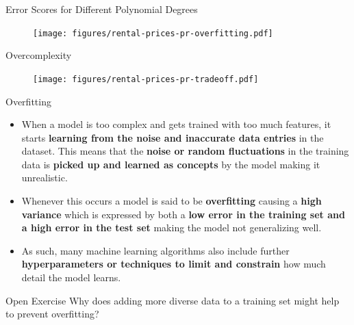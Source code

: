 \documentclass[main.tex]{subfiles}
\begin{document}
    \begin{frame}{Error Scores for Different Polynomial Degrees}
        \begin{figure}
            \label{fig:rental-prices-pr-overfitting}
            \texttt{[image: figures/rental-prices-pr-overfitting.pdf]}
        \end{figure}
    \end{frame}

    \begin{frame}{Overcomplexity}
        \begin{figure}
            \label{fig:rental-prices-pr-tradeoff}
            \texttt{[image: figures/rental-prices-pr-tradeoff.pdf]}
        \end{figure}
    \end{frame}

    \begin{frame}{Overfitting}
        \begin{itemize}
            \item When a model is too complex and gets trained with too much features, it starts \textbf{learning from the noise and inaccurate data entries} in the dataset. This means that the \textbf{noise or random fluctuations} in the training data is \textbf{picked up and learned as concepts} by the model making it unrealistic.
            \item Whenever this occurs a model is said to be \textbf{overfitting} causing a \textbf{high variance} which is expressed by both a \textbf{low error in the training set and a high error in the test set} making the model not generalizing well.
            \item As such, many machine learning algorithms also include further \textbf{hyperparameters or techniques to limit and constrain} how much detail the model learns.
        \end{itemize}
    \end{frame}

    \begin{frame}{Open Exercise }
        Why does adding more diverse data to a training set might help to prevent overfitting?
    \end{frame}
    
\end{document}
